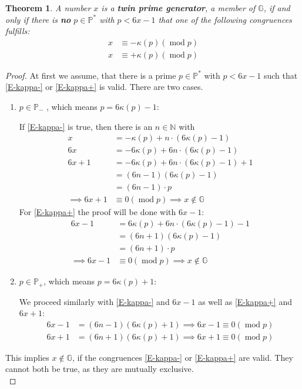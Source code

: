 \documentclass[fmeq,reqno]{amsart}
\newtheorem{theorem}{Theorem}[section]
\theoremstyle{definition}
\theoremstyle{remark}
\numberwithin{equation}{section}
\newcommand{\G}{\mathbb{G}}
\newcommand{\p}{\mathbb{P}}
\newcommand{\M}[1]{\mathbb{#1}}
\newcommand{\mood}[1]{(\operatorname{mod} #1)}
\begin{document}
\begin{theorem}\label{T-twinprimegenerators}
A number $x$ is a \textbf{twin prime generator}, a member of $\G$, if and only if there is \textbf{no} $p \in \p^*$ with $p<6x-1$ that one of the following congruences fulfills:
\begin{align}
x &\equiv - \kappa(p)\mood{p} \label{E-kappa-}
\\
x &\equiv + \kappa(p)\mood{p} \label{E-kappa+}
\end{align}
\end{theorem}
\begin{proof}
At first we assume, that there is a prime $p\in\p^*$ with $p<6x-1$ such that \eqref{E-kappa-} or \eqref{E-kappa+} is valid. There are two cases.
\begin{enumerate}
\item{
$p \in \p_-$ , which means $p=6\kappa(p)-1$:

If \eqref{E-kappa-} is true, then there is an $n \in \M{N}$ with
\begin{align*}
x &= -\kappa(p)+n \cdot (6\kappa(p)-1)\\
6x &= -6\kappa(p)+6n \cdot (6\kappa(p)-1)\\ 
6x+1 &=-6\kappa(p)+6n \cdot (6\kappa(p)-1)+1\\
&=(6n-1)(6\kappa(p)-1)\\
&=(6n-1)\cdot p\\
\implies 6x+1 &\equiv 0 \mood{p} \implies x \notin \G
\end{align*}
For \eqref{E-kappa+} the proof will be done with $6x-1$:
\begin{align*}
6x-1 &=6\kappa(p)+6n \cdot (6\kappa(p)-1)-1\\
&=(6n+1)(6\kappa(p)-1)\\
&=(6n+1)\cdot p\\
\implies 6x-1 &\equiv 0 \mood{p} \implies x \notin \G
\end{align*}
}
\item{
$p \in \p_+$, which means $p=6\kappa(p)+1$:

We proceed similarly with \eqref{E-kappa-} and $6x-1$ as well as \eqref{E-kappa+} and $6x+1$:
\begin{align*}
6x-1 &=(6n-1)(6\kappa(p)+1) \implies 6x-1 \equiv 0 \mood{p}\\
6x+1 &=(6n+1)(6\kappa(p)+1) \implies 6x+1 \equiv 0 \mood{p}
\end{align*}
}
\end{enumerate}
This implies $x \notin \G$, if the congruences \eqref{E-kappa-} or \eqref{E-kappa+} are valid. They cannot both be true, as they are mutually exclusive. \\


\end{proof}
\end{document}
